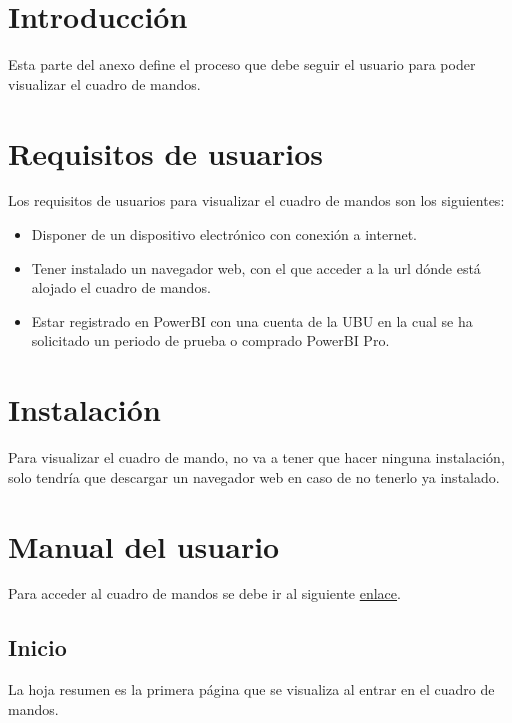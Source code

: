 
\section{Introducción}
Esta parte del anexo define el proceso que debe seguir el usuario para poder visualizar el cuadro de mandos.

\section{Requisitos de usuarios}
Los requisitos de usuarios para visualizar el cuadro de mandos son los siguientes:
\begin{itemize}
    \item Disponer de un dispositivo electrónico con conexión a internet.
    \item Tener instalado un navegador web, con el que acceder a la url dónde está alojado el cuadro de mandos.
    \item Estar registrado en PowerBI con una cuenta de la UBU en la cual se ha solicitado un periodo de prueba o comprado PowerBI Pro. 
\end{itemize}

\section{Instalación}
Para visualizar el cuadro de mando, no va a tener que hacer ninguna instalación, solo tendría que descargar un navegador web en caso de no tenerlo ya instalado.

\section{Manual del usuario}
Para acceder al cuadro de mandos se debe ir al siguiente \href{https://app.powerbi.com/reportEmbed?reportId=1bac7505-a8ee-4592-81ea-4d9384ce787d&autoAuth=true&ctid=2aa3b0b5-a782-4f38-a898-e483b20e8d61&config=eyJjbHVzdGVyVXJsIjoiaHR0cHM6Ly93YWJpLW5vcnRoLWV1cm9wZS1yZWRpcmVjdC5hbmFseXNpcy53aW5kb3dzLm5ldC8ifQ\%3D\%3D}{enlace}.

\subsection{Inicio}
La hoja resumen es la primera página que se visualiza al entrar en el cuadro de mandos.

